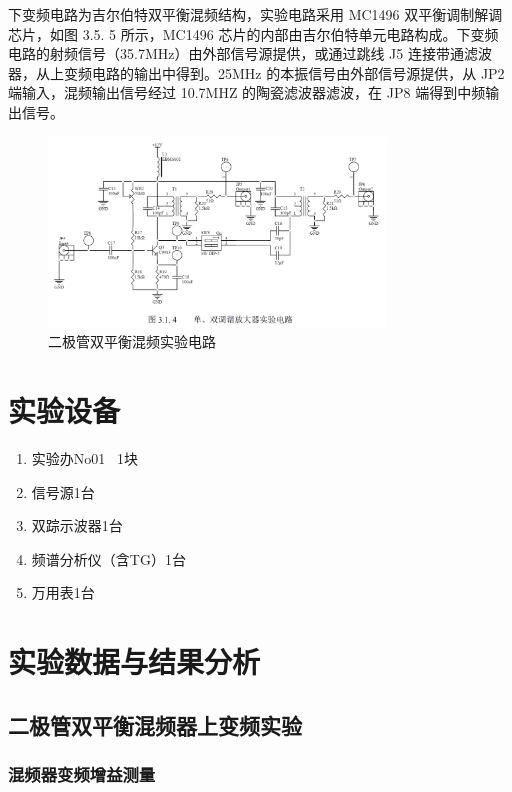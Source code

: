 \documentclass{../source/Experiment}
\begin{document}
    下变频电路为吉尔伯特双平衡混频结构，实验电路采用 MC1496 双平衡调制解调芯片，如图 3.5. 5 所示，MC1496 芯片的内部由吉尔伯特单元电路构成。下变频电路的射频信号（35.7MHz）由外部信号源提供，或通过跳线 J5 连接带通滤波器，从上变频电路的输出中得到。25MHz 的本振信号由外部信号源提供，从 JP2 端输入，混频输出信号经过 10.7MHZ 的陶瓷滤波器滤波，在 JP8 端得到中频输出信号。

    \begin{figure}[H]
        \centering
        \includegraphics[width = 0.8\textwidth]{pic/fig2.png}
        \caption{二极管双平衡混频实验电路}
    \end{figure}

    \section{实验设备}
        \begin{enumerate}
            \item 实验办No01 \, 1块
            \item 信号源1台
            \item 双踪示波器1台
            \item 频谱分析仪（含TG）1台
            \item 万用表1台
        \end{enumerate}
        
    \section{实验数据与结果分析}
        \subsection{二极管双平衡混频器上变频实验}
            \subsubsection{混频器变频增益测量}
            
\end{document}
